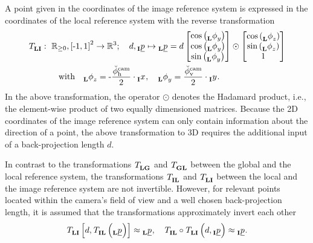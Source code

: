 A point given in the coordinates of the image reference system is expressed
in the coordinates of the local reference system with the reverse transformation
\begin{align} \label{eq:image_to_local_transformation}
    \trafo[]{}{\lrs\irs}{}{}
    &:\ 
    \mathbb{R}_{\ge 0}, \left[ \text{-}1, 1 \right]^2 \rightarrow \mathbb{R}^3
    ; \quad
    d, \pos[]{}{}{\irs}{} \mapsto \pos[]{}{}{\lrs}{}
    =
    d \begin{bmatrix}
        \cos \left( \ang[]{}{y}{\lrs}{} \right) \\
        \cos \left( \ang[]{}{y}{\lrs}{} \right) \\
        \sin \left( \ang[]{}{y}{\lrs}{} \right)
    \end{bmatrix} \odot \begin{bmatrix}
        \cos \left( \ang[]{}{z}{\lrs}{} \right) \\
        \sin \left( \ang[]{}{z}{\lrs}{} \right) \\
        1
    \end{bmatrix}
    \nonumber \\
    & \qquad \text{with} \quad
    \ang[]{}{z}{\lrs}{}
    = 
    \text - \frac{\ang[\user]{\camera}{\text h}{}{}}{2} \cdot \x[]{}{}{\irs}{}
    ,\quad 
    \ang[]{}{y}{\lrs}{}
    = 
    \frac{\ang[\user]{\camera}{\text v}{}{}}{2} \cdot \y[]{}{}{\irs}{}.
\end{align}
In the above transformation,
the operator 
$\odot$ 
denotes the Hadamard product, 
i.e., the element-wise product of two equally dimensioned matrices.
Because the 2D coordinates of the image reference system
can only contain information about the direction of a point,
the above transformation to 3D requires the additional input of a back-projection length $d$.

In contrast to the transformations 
$\trafo[]{}{\lrs\grs}{}{}$
and 
$\trafo[]{}{\grs\lrs}{}{}$
between the global and the local reference system,
the transformations 
$\trafo[]{}{\irs\lrs}{}{}$
and 
$\trafo[]{}{\lrs\irs}{}{}$
between the local and the image reference system
are not invertible.
However, for relevant points
located within the camera's field of view
and a well chosen back-projection length,
it is assumed that the transformations approximately invert each other
\begin{equation}
    \trafo[]{}{\lrs\irs}{}{} \left[
        d, \trafo[]{}{\irs\lrs}{}{} \left( \pos[]{}{}{\lrs}{} \right)
    \right]
    \approx
    \pos[]{}{}{\lrs}{}
    ,\quad
    \trafo[]{}{\irs\lrs}{}{}
    \circ 
    \trafo[]{}{\lrs\irs}{}{} \left(
        d, \pos[]{}{}{\irs}{}
    \right)
    \approx
    \pos[]{}{}{\irs}{}.
\end{equation}





